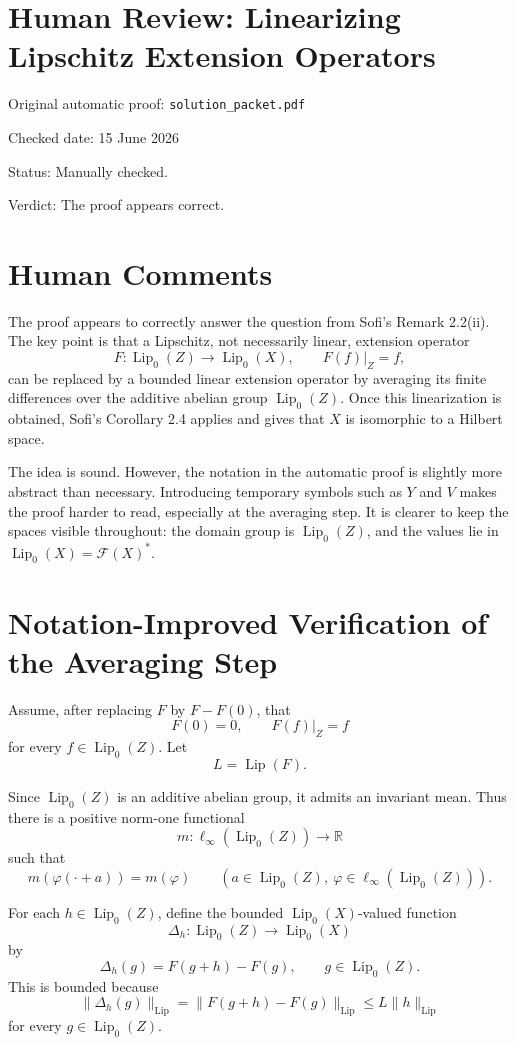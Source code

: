 ﻿\documentclass[11pt]{article}
\newcommand{\Lipz}{\operatorname{Lip}_0}
\newcommand{\Lip}{\operatorname{Lip}}
\newcommand{\FF}{\mathcal F}
\begin{document}
\section*{Human Review: Linearizing Lipschitz Extension Operators}

\noindent Original automatic proof: \texttt{solution\_packet.pdf}

\noindent Checked date: 15 June 2026

\noindent Status: Manually checked.

\noindent Verdict: The proof appears correct.

\section*{Human Comments}

The proof appears to correctly answer the question from Sofi's Remark 2.2(ii). The key point is that a Lipschitz, not necessarily linear, extension operator
\[
  F:\Lipz(Z)\longrightarrow \Lipz(X),
  \qquad F(f)|_Z=f,
\]
can be replaced by a bounded linear extension operator by averaging its finite differences over the additive abelian group \(\Lipz(Z)\). Once this linearization is obtained, Sofi's Corollary 2.4 applies and gives that \(X\) is isomorphic to a Hilbert space.

The idea is sound. However, the notation in the automatic proof is slightly more abstract than necessary. Introducing temporary symbols such as \(Y\) and \(V\) makes the proof harder to read, especially at the averaging step. It is clearer to keep the spaces visible throughout: the domain group is \(\Lipz(Z)\), and the values lie in \(\Lipz(X)=\FF(X)^*\).

\section*{Notation-Improved Verification of the Averaging Step}

Assume, after replacing \(F\) by \(F-F(0)\), that
\[
  F(0)=0,
  \qquad F(f)|_Z=f
\]
for every \(f\in\Lipz(Z)\). Let
\[
  L=\Lip(F).
\]

Since \(\Lipz(Z)\) is an additive abelian group, it admits an invariant mean. Thus there is a positive norm-one functional
\[
  m:\ell_\infty(\Lipz(Z))\longrightarrow \mathbb R
\]
such that
\[
  m(\varphi(\cdot+a))=m(\varphi)
  \qquad
  (a\in\Lipz(Z),\ \varphi\in\ell_\infty(\Lipz(Z))).
\]

For each \(h\in\Lipz(Z)\), define the bounded \(\Lipz(X)\)-valued function
\[
  \Delta_h:\Lipz(Z)\longrightarrow \Lipz(X)
\]
by
\[
  \Delta_h(g)=F(g+h)-F(g),
  \qquad g\in\Lipz(Z).
\]
This is bounded because
\[
  \|\Delta_h(g)\|_{\Lip}
  =\|F(g+h)-F(g)\|_{\Lip}
  \leq L\|h\|_{\Lip}
\]
for every \(g\in\Lipz(Z)\).
\end{document}
